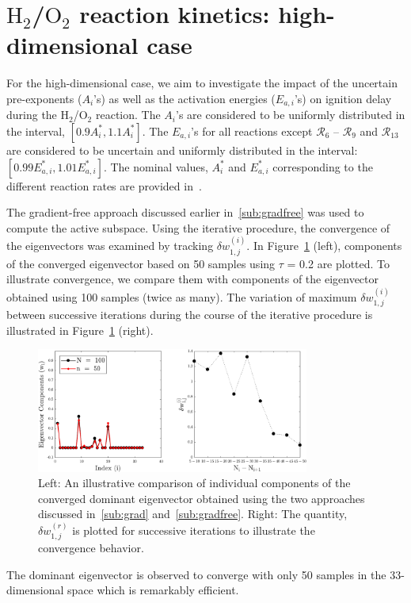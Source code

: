 \section{$\text{H}_2$/$\text{O}_2$ reaction kinetics: high-dimensional case}
\label{sec:app}

For the high-dimensional case, we aim to investigate the impact of the uncertain
pre-exponents ($A_i$'s) as well as the activation energies ($E_{a,i}$'s) on ignition 
delay during the H$_2$/O$_2$ reaction. The $A_i$'s are considered to be uniformly
distributed in the interval, $[0.9A_i^\ast, 1.1A_i^\ast]$. The $E_{a,i}$'s for all
reactions except $\mathcal{R}_6$ -- $\mathcal{R}_9$ and $\mathcal{R}_{13}$
are considered to be uncertain and uniformly distributed in the interval: 
$[0.99E_{a,i}^\ast, 1.01E_{a,i}^\ast]$. The nominal values, $A_i^\ast$ and $E_{a,i}^\ast$
corresponding to the different reaction rates are provided in~\cite{Yetter:1991}. 

The gradient-free approach discussed earlier in~\ref{sub:gradfree} was used to compute the
active subspace. Using the iterative procedure, the convergence of the eigenvectors
was examined by tracking $\delta w_{1,j}^{(i)}$. In Figure~\ref{fig:conv_app} (left),
components of the converged eigenvector based on 50 samples using $\tau$ = 0.2 are plotted.
To illustrate convergence, we compare them with components of the eigenvector obtained
using 100 samples (twice as many). The variation of maximum $\delta w_{1,j}^{(i)}$ between
successive iterations during the course of the iterative procedure is illustrated in 
Figure~\ref{fig:conv_app} (right). 
%
\begin{figure}[htbp]
 \begin{center}
  \includegraphics[width=0.8\textwidth]{./Figures/eigv10}
\caption{Left: An illustrative comparison of individual components of the converged dominant eigenvector obtained
using the two approaches discussed in~\ref{sub:grad} and~\ref{sub:gradfree}. Right: The quantity,  $\delta w_{1,j}^{(r)}$
is plotted for successive iterations to illustrate the convergence behavior.}
\label{fig:conv_app}
\end{center}
\end{figure}
%
The dominant eigenvector is observed to converge with only 50 samples in the 33-dimensional space which is remarkably efficient. 

